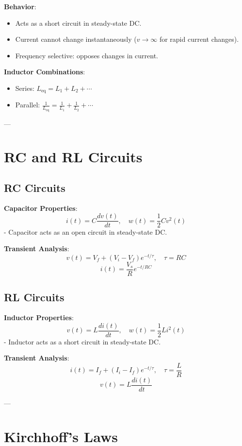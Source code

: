 \documentclass[9pt]{article}
\begin{document}
\begin{multicols}{2}
\textbf{Behavior}:
\begin{itemize}\itemsep0pt
    \item Acts as a short circuit in steady-state DC.
    \item Current cannot change instantaneously (\(v \to \infty\) for rapid current changes).
    \item Frequency selective: opposes changes in current.
\end{itemize}

\textbf{Inductor Combinations}:
\begin{itemize}\itemsep0pt
    \item Series: \( L_{\text{eq}} = L_1 + L_2 + \cdots \)
    \item Parallel: \( \frac{1}{L_{\text{eq}}} = \frac{1}{L_1} + \frac{1}{L_2} + \cdots \)
\end{itemize}

---

\section{RC and RL Circuits}

\subsection{RC Circuits}
\textbf{Capacitor Properties}:
\[
i(t) = C \frac{dv(t)}{dt}, \quad w(t) = \frac{1}{2} C v^2(t)
\]
- Capacitor acts as an open circuit in steady-state DC.

\textbf{Transient Analysis}:
\[
v(t) = V_f + (V_i - V_f)e^{-t/\tau}, \quad \tau = RC
\]
\[
i(t) = \frac{V_s}{R}e^{-t/RC}
\]

\subsection{RL Circuits}
\textbf{Inductor Properties}:
\[
v(t) = L \frac{di(t)}{dt}, \quad w(t) = \frac{1}{2} L i^2(t)
\]
- Inductor acts as a short circuit in steady-state DC.

\textbf{Transient Analysis}:
\[
i(t) = I_f + (I_i - I_f)e^{-t/\tau}, \quad \tau = \frac{L}{R}
\]
\[
v(t) = L \frac{di(t)}{dt}
\]

---

\section{Kirchhoff’s Laws}


\end{multicols}
\end{document}
